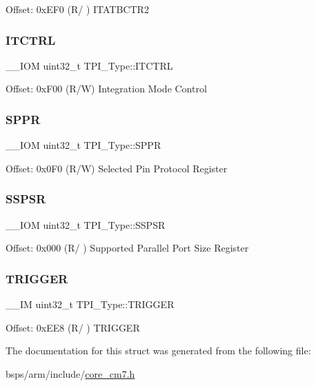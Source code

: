 Offset\+: 0x\+E\+F0 (R/ ) I\+T\+A\+T\+B\+C\+T\+R2 \mbox{\label{structTPI__Type_aaa4c823c10f115f7517c82ef86a5a68d}} 
\subsubsection{\texorpdfstring{ITCTRL}{ITCTRL}}
{\footnotesize\ttfamily \+\_\+\+\_\+\+I\+OM uint32\+\_\+t T\+P\+I\+\_\+\+Type\+::\+I\+T\+C\+T\+RL}

Offset\+: 0x\+F00 (R/W) Integration Mode Control \mbox{\label{structTPI__Type_a12f79d4e3ddc69893ba8bff890d04cc5}} 
\subsubsection{\texorpdfstring{SPPR}{SPPR}}
{\footnotesize\ttfamily \+\_\+\+\_\+\+I\+OM uint32\+\_\+t T\+P\+I\+\_\+\+Type\+::\+S\+P\+PR}

Offset\+: 0x0\+F0 (R/W) Selected Pin Protocol Register \mbox{\label{structTPI__Type_a7b72598e20066133e505bb781690dc22}} 
\subsubsection{\texorpdfstring{SSPSR}{SSPSR}}
{\footnotesize\ttfamily \+\_\+\+\_\+\+I\+OM uint32\+\_\+t T\+P\+I\+\_\+\+Type\+::\+S\+S\+P\+SR}

Offset\+: 0x000 (R/ ) Supported Parallel Port Size Register \mbox{\label{structTPI__Type_a4d4cd2357f72333a82a1313228287bbd}} 
\subsubsection{\texorpdfstring{TRIGGER}{TRIGGER}}
{\footnotesize\ttfamily \+\_\+\+\_\+\+IM uint32\+\_\+t T\+P\+I\+\_\+\+Type\+::\+T\+R\+I\+G\+G\+ER}

Offset\+: 0x\+E\+E8 (R/ ) T\+R\+I\+G\+G\+ER 

The documentation for this struct was generated from the following file\+:\begin{DoxyCompactItemize}
\item 
bsps/arm/include/\mbox{\hyperlink{core__cm7_8h}{core\+\_\+cm7.\+h}}\end{DoxyCompactItemize}
